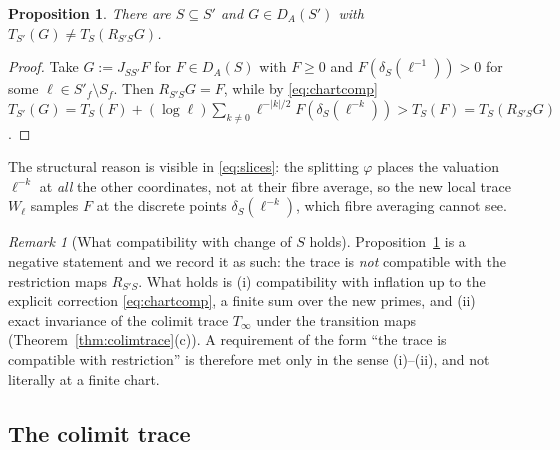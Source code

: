 \documentclass[11pt]{amsart}
\newtheorem{proposition}[theorem]{Proposition}
\theoremstyle{definition}
\theoremstyle{remark}
\newtheorem{remark}[theorem]{Remark}
\newcommand{\DA}{D_A}
\begin{document}
\begin{proposition}\label{prop:resnotrace}
There are $S\subseteq S'$ and $G\in\DA(S')$ with $T_{S'}(G)\ne T_S(R_{S'S}G)$.
\end{proposition}

\begin{proof}
Take $G:=J_{SS'}F$ for $F\in\DA(S)$ with $F\ge0$ and
$F(\delta_S(\ell^{-1}))>0$ for some $\ell\in S'_f\setminus S_f$.  Then
$R_{S'S}G=F$, while by \eqref{eq:chartcomp}
$T_{S'}(G)=T_S(F)+(\log\ell)\sum_{k\ne0}\ell^{-|k|/2}F(\delta_S(\ell^{-k}))>
T_S(F)=T_S(R_{S'S}G)$.
\end{proof}

The structural reason is visible in \eqref{eq:slices}: the splitting $\varphi$
places the valuation $\ell^{-k}$ at \emph{all} the other coordinates, not at
their fibre average, so the new local trace $W_{\ell}$ samples $F$ at the
discrete points $\delta_S(\ell^{-k})$, which fibre averaging cannot see.

\begin{remark}[What compatibility with change of $S$ holds]\label{rem:restrictionstatus}
Proposition~\ref{prop:resnotrace} is a negative statement and we record it as
such: the trace is \emph{not} compatible with the restriction maps $R_{S'S}$.
What holds is (i) compatibility with inflation up to the explicit correction
\eqref{eq:chartcomp}, a finite sum over the new primes, and (ii) exact
invariance of the colimit trace $T_{\infty}$ under the transition maps
(Theorem~\ref{thm:colimtrace}(c)).  A requirement of the form ``the trace is
compatible with restriction'' is therefore met only in the sense (i)--(ii),
and not literally at a finite chart.
\end{remark}

\subsection{The colimit trace}
\end{document}
